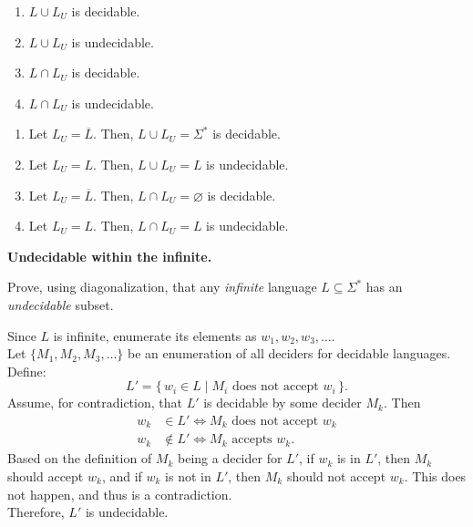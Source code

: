 \documentclass[11pt,addpoints,answers]{exam}
\begin{document}
\begin{questions}
\begin{parts}
    \begin{enumerate}
    \item $L \cup L_U$ is decidable.
    \item $L \cup L_U$ is undecidable.
    \item $L \cap L_U$ is decidable.
    \item $L \cap L_U$ is undecidable.
    \end{enumerate}
    
    \begin{solution} 
    \begin{enumerate}
      \item Let $L_U = \overline{L}$. Then, $L \cup L_U = \Sigma^*$ is decidable.
      \item Let $L_U = L$. Then, $L \cup L_U = L$ is undecidable.
      \item Let $L_U = \overline{L}$. Then, $L \cap L_U = \varnothing$ is decidable.
      \item Let $L_U = L$. Then, $L \cap L_U = L$ is undecidable.
    \end{enumerate}
    \end{solution}
    
  \end{parts}
  \pagebreak

  \question [6] \textbf{Undecidable within the infinite.}

  Prove, using diagonalization, that any \emph{infinite} language $L \subseteq \Sigma^*$ has an \emph{undecidable} subset.

  
  \begin{solution}
    Since $L$ is infinite, enumerate its elements as $w_1, w_2, w_3, \dots$. \\
    Let $\{M_1, M_2, M_3, \dots\}$ be an enumeration of all deciders for decidable languages. \\
    Define:
    \[
    L' = \{\,w_i \in L \mid M_i \text{ does not accept } w_i\,\}.
    \]
    Assume, for contradiction, that $L'$ is decidable by some decider $M_k$. Then
    \begin{align*}
      w_k &\in L' \iff M_k \text{ does not accept } w_k \\
      w_k &\notin L' \iff M_k \text{ accepts } w_k.
    \end{align*}
    Based on the definition of $M_k$ being a decider for $L'$, if $w_k$ is in $L'$, then $M_k$ should accept $w_k$, and if $w_k$ is not in $L'$, then $M_k$ should not accept $w_k$. This does not happen, and thus is a contradiction. \\
    Therefore, $L'$ is undecidable.
  \end{solution}


\end{questions}
\end{document}
